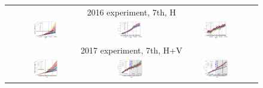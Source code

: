 \documentclass[%
 reprint,
 amsmath,amssymb,
 aps,
prstab,
longbibliography
]{revtex4-1}
\begin{document}
\begin{figure}
  \begin{tabular}{ccc}
    \multicolumn{3}{c}{2016 experiment, 7th, H}	\\
    \includegraphics[width=0.32\textwidth]{2016_bunch_intensity_h7th_no_damper_avg.png} &
    \includegraphics[width=0.32\textwidth]{2016_emith_avg_rel_h7th_no_damper.png} &
    \includegraphics[width=0.32\textwidth]{2016_emitv_avg_rel_h7th_no_damper.png} \\
    \multicolumn{3}{c}{2017 experiment, 7th, H+V} \\
    \includegraphics[width=0.32\textwidth]{2017_bunch_intensity_hv7th_no_damper_avg.png} &
    \includegraphics[width=0.32\textwidth]{2017_emith_avg_rel_hv7th_no_damper.png} &
    \includegraphics[width=0.32\textwidth]{2017_emitv_avg_rel_hv7th_no_damper.png} \\

\end{tabular}
\end{figure}
\end{document}
